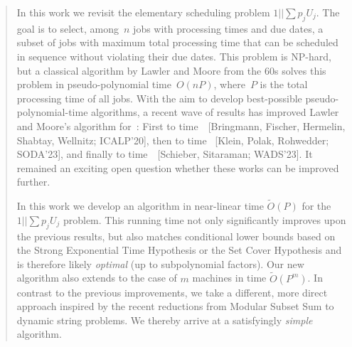 \documentclass[10pt,a4paper]{article}
\newcommand\Order{O}
\begin{document}
\maketitle




\begin{abstract}
    In this work we revisit the elementary scheduling problem $1||\sum p_j U_j$. The goal is to select, among~$n$ jobs with processing times and due dates, a subset of jobs with maximum total processing time that can be scheduled in sequence without violating their due dates. This problem is NP-hard, but a classical algorithm by Lawler and Moore from the 60s solves this problem in pseudo-polynomial time~$\Order(nP)$, where~$P$ is the total processing time of all jobs. With the aim to develop best-possible pseudo-polynomial-time algorithms, a recent wave of results has improved Lawler and Moore's algorithm for~: First to time~\smash{$\widetilde\Order(P^{7/4})$}~[Bringmann, Fischer, Hermelin, Shabtay, Wellnitz; ICALP'20], then to time \smash{$\widetilde\Order(P^{5/3})$}~[Klein, Polak, Rohwedder; SODA'23], and finally to time~\smash{$\widetilde\Order(P^{7/5})$}~[Schieber, Sitaraman; WADS'23]. It remained an exciting open question whether these works can be improved further.
    
    In this work we develop an algorithm in near-linear time $\widetilde\Order(P)$ for the $1||\sum p_j U_j$ problem. This running time not only significantly improves upon the previous results, but also matches conditional lower bounds based on the Strong Exponential Time Hypothesis or the Set Cover Hypothesis and is therefore likely \emph{optimal} (up to subpolynomial factors). Our new algorithm also extends to the case of $m$ machines in time $\widetilde\Order(P^m)$. In contrast to the previous improvements, we take a different, more direct approach inspired by the recent reductions from Modular Subset Sum to dynamic string problems. We thereby arrive at a satisfyingly \emph{simple} algorithm.
\end{abstract}


\end{document}
